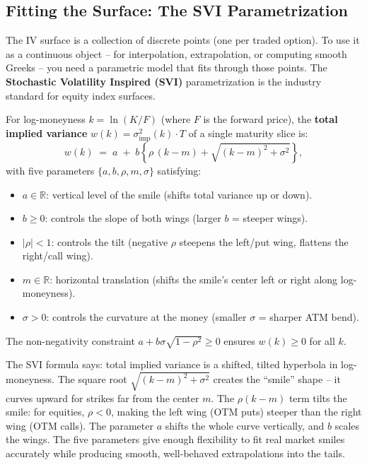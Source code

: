 \subsection{Fitting the Surface: The SVI Parametrization}\label{sec:svi}

The IV surface is a collection of discrete points (one per traded option).
To use it as a continuous object -- for interpolation, extrapolation, or computing smooth Greeks -- you need a parametric model that fits through those points.
The \textbf{Stochastic Volatility Inspired (SVI)} parametrization \citep{GatheralJacquier2014} is the industry standard for equity index surfaces.

\begin{definition}
\label{def:svi}
For log-moneyness $k = \ln(K/F)$ (where $F$ is the forward price), the \textbf{total implied variance} $w(k) = \sigma_{\text{imp}}^2(k) \cdot T$ of a single maturity slice is:
\begin{equation}\label{eq:svi-raw}
w(k) \;=\; a \;+\; b\!\left\{\rho\,(k - m) + \sqrt{(k-m)^2 + \sigma^2}\right\},
\end{equation}
with five parameters $\{a, b, \rho, m, \sigma\}$ satisfying:
\begin{itemize}[nosep]
  \item $a \in \mathbb{R}$: vertical level of the smile (shifts total variance up or down).
  \item $b \geq 0$: controls the slope of both wings (larger $b$ = steeper wings).
  \item $|\rho| < 1$: controls the tilt (negative $\rho$ steepens the left/put wing, flattens the right/call wing).
  \item $m \in \mathbb{R}$: horizontal translation (shifts the smile's center left or right along log-moneyness).
  \item $\sigma > 0$: controls the curvature at the money (smaller $\sigma$ = sharper ATM bend).
\end{itemize}
The non-negativity constraint $a + b\sigma\sqrt{1 - \rho^2} \geq 0$ ensures $w(k) \geq 0$ for all $k$.
\end{definition}

\begin{intuition}
The SVI formula says: total implied variance is a shifted, tilted hyperbola in log-moneyness.
The square root $\sqrt{(k-m)^2 + \sigma^2}$ creates the ``smile'' shape -- it curves upward for strikes far from the center $m$.
The $\rho(k-m)$ term tilts the smile: for equities, $\rho < 0$, making the left wing (OTM puts) steeper than the right wing (OTM calls).
The parameter $a$ shifts the whole curve vertically, and $b$ scales the wings.
The five parameters give enough flexibility to fit real market smiles accurately while producing smooth, well-behaved extrapolations into the tails.
\end{intuition}

